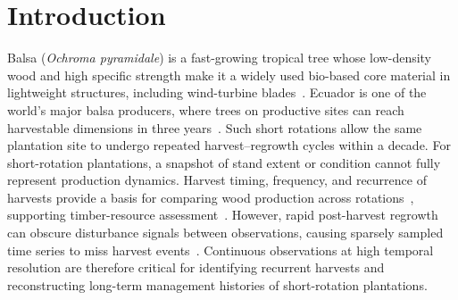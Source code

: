 
\section{Introduction}
\label{sec:introduction}



Balsa (\textit{Ochroma pyramidale}) is a fast-growing tropical tree whose low-density wood and high specific strength make it a widely used bio-based core material in lightweight structures, including wind-turbine blades~\citep{Borrega2015Balsa_mechanics}. Ecuador is one of the world's major balsa producers, where trees on productive sites can reach harvestable dimensions in three years~\citep{CanadasLopez2019BalsaGrowth}. Such short rotations allow the same plantation site to undergo repeated harvest--regrowth cycles within a decade. For short-rotation plantations, a snapshot of stand extent or condition cannot fully represent production dynamics. Harvest timing, frequency, and recurrence of harvests provide a basis for comparing wood production across rotations~\citep{McMahon2019EucalyptusRotations}, supporting timber-resource assessment~\citep{LeMaire2011EucalyptusBiomass}. However, rapid post-harvest regrowth can obscure disturbance signals between observations, causing sparsely sampled time series to miss harvest events~\citep{Huang2026EucalyptusAge}. Continuous observations at high temporal resolution are therefore critical for identifying recurrent harvests and reconstructing long-term management histories of short-rotation plantations.

